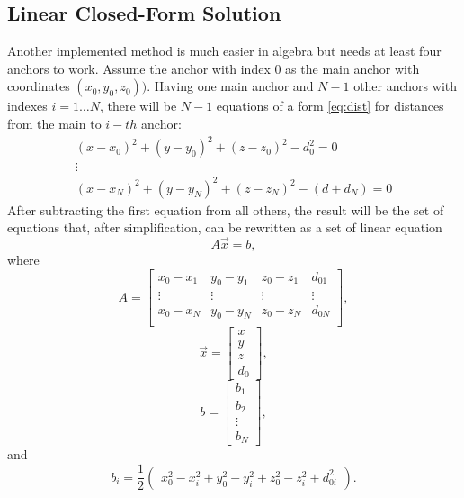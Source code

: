 \documentclass[journal]{IEEEtran}
\begin{document}
\subsection{Linear Closed-Form Solution}
\label{sec:solution_lsq}
Another implemented method is much easier in algebra but needs at least four anchors to work.
Assume the anchor with index $0$ as the main anchor with coordinates $(x_0, y_0, z_0))$.
Having one main anchor and $N-1$ other anchors with indexes $i=1 \ldots N$, there will be $N-1$ equations of a form \autoref{eq:dist} for distances from the main to $i-th$ anchor:
\begin{equation}
    \begin{array}{cc}
        (x-x_0)^2 + (y-y_0)^2 + (z-z_0)^2 - d_0^2 = 0\\
        \vdots \\
        (x-x_N)^2 + (y-y_N)^2 + (z-z_N)^2 - (d + d_{N}) = 0
    \end{array}
\end{equation}
After subtracting the first equation from all others, the result will be the set of equations that, after simplification, can be rewritten as a set of linear equation
\begin{equation}
    A\vec{x} = b,
\end{equation}
where
\begin{equation}
    A = \left[ \begin{array}{cccc}
         x_0 - x_1 & y_0 - y_1 & z_0 - z_1 & d_{01}  \\
         \vdots & \vdots & \vdots & \vdots \\
         x_0 - x_N & y_0 - y_N & z_0 - z_N & d_{0N}  \\
    \end{array} \right],
\end{equation}
\begin{equation}
    \vec{x} = \left[ \begin{array}{c}
         x \\ y \\ z \\ d_0
    \end{array} \right],
\end{equation}
\begin{equation}
    b = \left[ \begin{array}{c}
         b_1 \\ b_2 \\ \vdots \\ b_N
    \end{array} \right],
\end{equation}
and 
\begin{equation}
    b_i = \frac{1}{2} \left( \begin{array}{c}
         x_0^2 - x_i^2 + y_0^2 - y_i^2 + z_0^2 - z_i^2 + d_{0i}^2
    \end{array} \right).
\end{equation}
\end{document}
